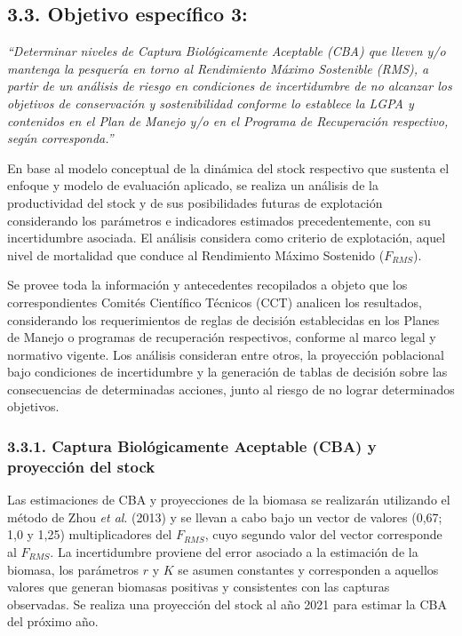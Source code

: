 \documentclass[
  spanish,
]{article}
\begin{document}
\hypertarget{objetivo-especuxedfico-3}{%
\subsection{3.3. Objetivo específico
3:}\label{objetivo-especuxedfico-3}}

\vspace{-0.2cm}

\emph{``Determinar niveles de Captura Biológicamente Aceptable (CBA) que
lleven y/o mantenga la pesquería en torno al Rendimiento Máximo
Sostenible (RMS), a partir de un análisis de riesgo en condiciones de
incertidumbre de no alcanzar los objetivos de conservación y
sostenibilidad conforme lo establece la LGPA y contenidos en el Plan de
Manejo y/o en el Programa de Recuperación respectivo, según
corresponda.''} \vspace{0.5cm}

En base al modelo conceptual de la dinámica del stock respectivo que
sustenta el enfoque y modelo de evaluación aplicado, se realiza un
análisis de la productividad del stock y de sus posibilidades futuras de
explotación considerando los parámetros e indicadores estimados
precedentemente, con su incertidumbre asociada. El análisis considera
como criterio de explotación, aquel nivel de mortalidad que conduce al
Rendimiento Máximo Sostenido (\(F_{RMS}\)).

Se provee toda la información y antecedentes recopilados a objeto que
los correspondientes Comités Científico Técnicos (CCT) analicen los
resultados, considerando los requerimientos de reglas de decisión
establecidas en los Planes de Manejo o programas de recuperación
respectivos, conforme al marco legal y normativo vigente. Los análisis
consideran entre otros, la proyección poblacional bajo condiciones de
incertidumbre y la generación de tablas de decisión sobre las
consecuencias de determinadas acciones, junto al riesgo de no lograr
determinados objetivos.

\hypertarget{captura-bioluxf3gicamente-aceptable-cba-y-proyecciuxf3n-del-stock}{%
\subsubsection{3.3.1. Captura Biológicamente Aceptable (CBA) y
proyección del
stock}\label{captura-bioluxf3gicamente-aceptable-cba-y-proyecciuxf3n-del-stock}}

Las estimaciones de CBA y proyecciones de la biomasa se realizarán
utilizando el método de Zhou \emph{et al}. (2013) y se llevan a cabo
bajo un vector de valores (0,67; 1,0 y 1,25) multiplicadores del
\(F_{RMS}\), cuyo segundo valor del vector corresponde al \(F_{RMS}\).
La incertidumbre proviene del error asociado a la estimación de la
biomasa, los parámetros \(r\) y \(K\) se asumen constantes y
corresponden a aquellos valores que generan biomasas positivas y
consistentes con las capturas observadas. Se realiza una proyección del
stock al año 2021 para estimar la CBA del próximo año.
\end{document}
